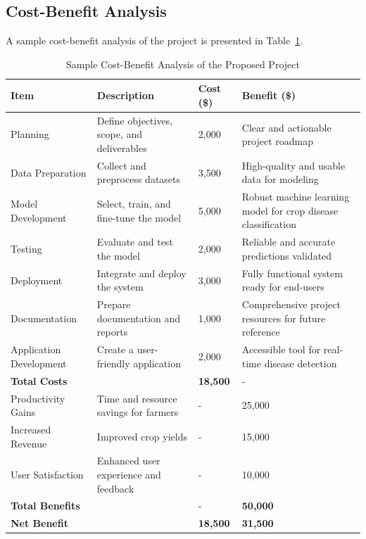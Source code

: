 \subsection{Cost-Benefit Analysis}
A sample cost-benefit analysis of the project is presented in Table~\ref{tab:cost-benefit}.
\begin{table}[h]
    \centering
    \caption{Sample Cost-Benefit Analysis of the Proposed Project}
    \label{tab:cost-benefit}
    {
    \begin{tabular}{|p{4cm}|p{4cm}|p{4cm}|p{4cm}|}
        \hline
        \textbf{Item} & \textbf{Description} & \textbf{Cost (\$)} & \textbf{Benefit (\$)} \\ \hline
        Planning & Define objectives, scope, and deliverables & 2,000 & Clear and actionable project roadmap \\ \hline
        Data Preparation & Collect and preprocess datasets & 3,500 & High-quality and usable data for modeling \\ \hline
        Model Development & Select, train, and fine-tune the model & 5,000 & Robust machine learning model for crop disease classification \\ \hline
        Testing & Evaluate and test the model & 2,000 & Reliable and accurate predictions validated \\ \hline
        Deployment & Integrate and deploy the system & 3,000 & Fully functional system ready for end-users \\ \hline
        Documentation & Prepare documentation and reports & 1,000 & Comprehensive project resources for future reference \\ \hline
        Application Development & Create a user-friendly application & 2,000 & Accessible tool for real-time disease detection \\ \hline
        \textbf{Total Costs} &  & \textbf{18,500} & - \\ \hline
        Productivity Gains & Time and resource savings for farmers & - & 25,000 \\ \hline
        Increased Revenue & Improved crop yields & - & 15,000 \\ \hline
        User Satisfaction & Enhanced user experience and feedback & - & 10,000 \\ \hline
        \textbf{Total Benefits} &  & - & \textbf{50,000} \\ \hline
        \textbf{Net Benefit} &  & \textbf{18,500} & \textbf{31,500} \\ \hline
    \end{tabular}
    }
\end{table}
